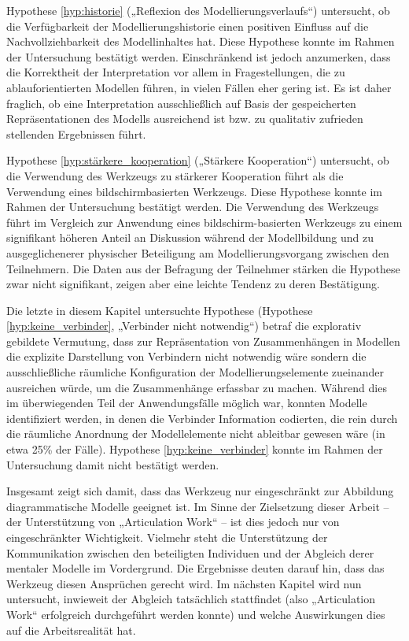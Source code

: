 Hypothese \ref{hyp:historie} („Reflexion des Modellierungsverlaufs“) untersucht, ob die Verfügbarkeit der Modellierungshistorie einen positiven Einfluss auf die Nachvollziehbarkeit des Modellinhaltes hat. Diese Hypothese konnte im Rahmen der Untersuchung bestätigt werden. Einschränkend ist jedoch anzumerken, dass die Korrektheit der Interpretation vor allem in Fragestellungen, die zu ablauforientierten Modellen führen, in vielen Fällen eher gering ist. Es ist daher fraglich, ob eine Interpretation ausschließlich auf Basis der gespeicherten Repräsentationen des Modells ausreichend ist bzw. zu qualitativ zufrieden stellenden Ergebnissen führt.

Hypothese \ref{hyp:stärkere_kooperation} („Stärkere Kooperation“) untersucht, ob die Verwendung des Werkzeugs zu stärkerer Kooperation führt als die Verwendung eines bildschirmbasierten Werkzeugs. Diese Hypothese konnte im Rahmen der Untersuchung bestätigt werden. Die Verwendung des Werkzeugs führt im Vergleich zur Anwendung eines bildschirm-basierten Werkzeugs zu einem signifikant höheren Anteil an Diskussion während der Modellbildung und zu ausgeglichenerer physischer Beteiligung am Modellierungsvorgang zwischen den Teilnehmern. Die Daten aus der Befragung der Teilnehmer stärken die Hypothese zwar nicht signifikant, zeigen aber eine leichte Tendenz zu deren Bestätigung. 

Die letzte in diesem Kapitel untersuchte Hypothese (Hypothese \ref{hyp:keine_verbinder}, „Verbinder nicht notwendig“) betraf die explorativ gebildete Vermutung, dass zur Repräsentation von Zusammenhängen in Modellen die explizite Darstellung von Verbindern nicht notwendig wäre sondern die ausschließliche räumliche Konfiguration der Modellierungselemente zueinander ausreichen würde, um die Zusammenhänge erfassbar zu machen. Während dies im überwiegenden Teil der Anwendungsfälle möglich war, konnten Modelle identifiziert werden, in denen die Verbinder Information codierten, die rein durch die räumliche Anordnung der Modellelemente nicht ableitbar gewesen wäre (in etwa 25\% der Fälle). Hypothese \ref{hyp:keine_verbinder} konnte im Rahmen der Untersuchung damit nicht bestätigt werden.

Insgesamt zeigt sich damit, dass das Werkzeug nur eingeschränkt zur Abbildung diagrammatische Modelle geeignet ist. Im Sinne der Zielsetzung dieser Arbeit -- der Unterstützung von „Articulation Work“ -- ist dies jedoch nur von eingeschränkter Wichtigkeit. Vielmehr steht die Unterstützung der Kommunikation zwischen den beteiligten Individuen und der Abgleich derer mentaler Modelle im Vordergrund. Die Ergebnisse deuten darauf hin, dass das Werkzeug diesen Ansprüchen gerecht wird. Im nächsten Kapitel wird nun untersucht, inwieweit der Abgleich tatsächlich stattfindet (also „Articulation Work“ erfolgreich durchgeführt werden konnte) und welche Auswirkungen dies auf die Arbeitsrealität hat.

